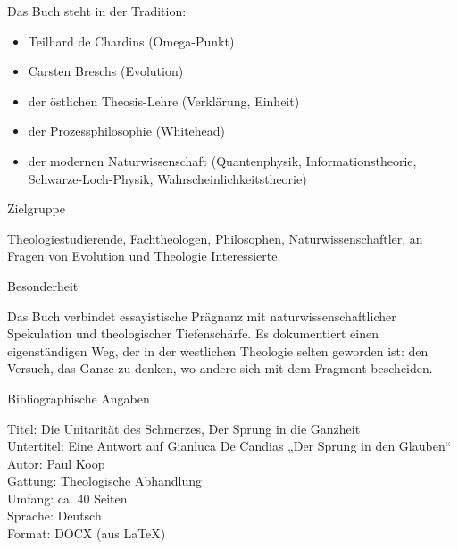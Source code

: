 \documentclass[
  ngerman,
]{article}
\begin{document}
Das Buch steht in der Tradition:

\begin{itemize}
\item
  Teilhard de Chardins (Omega-Punkt)
\item
  Carsten Breschs (Evolution)
\item
  der östlichen Theosis-Lehre (Verklärung, Einheit)
\item
  der Prozessphilosophie (Whitehead)
\item
  der modernen Naturwissenschaft (Quantenphysik, Informationstheorie,
  Schwarze-Loch-Physik, Wahrscheinlichkeitstheorie)
\end{itemize}

Zielgruppe

Theologiestudierende, Fachtheologen, Philosophen, Naturwissenschaftler,
an Fragen von Evolution und Theologie Interessierte.

Besonderheit

Das Buch verbindet essayistische Prägnanz mit naturwissenschaftlicher
Spekulation und theologischer Tiefenschärfe. Es dokumentiert einen
eigenständigen Weg, der in der westlichen Theologie selten geworden ist:
den Versuch, das Ganze zu denken, wo andere sich mit dem Fragment
bescheiden.

Bibliographische Angaben

Titel: Die Unitarität des Schmerzes, Der Sprung in die Ganzheit\\
Untertitel: Eine Antwort auf Gianluca De Candias „Der Sprung in den
Glauben``\\
Autor: Paul Koop\\
Gattung: Theologische Abhandlung\\
Umfang: ca. 40 Seiten\\
Sprache: Deutsch\\
Format: DOCX (aus LaTeX)
\end{document}
